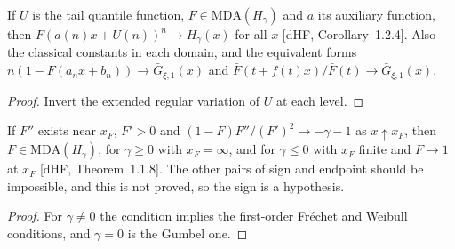 \begin{theorem}
  \label{thm:canonical-norming}
  \leanok
  If $U$ is the tail quantile function, $F \in \mathrm{MDA}(H_\gamma)$ and $a$ its auxiliary function, then
  $F(a(n) x + U(n))^n \to H_\gamma(x)$ for all $x$ [dHF, Corollary~1.2.4]. Also the classical constants in each
  domain, and the equivalent forms $n(1 - F(a_n x + b_n)) \to \bar G_{\xi, 1}(x)$ and
  $\bar F(t + f(t) x)/\bar F(t) \to \bar G_{\xi, 1}(x)$.
\end{theorem}
\begin{proof}
  \leanok
  Invert the extended regular variation of $U$ at each level.
\end{proof}

\begin{theorem}
  \label{thm:von-mises-unified}
  \leanok
  If $F'' $ exists near $x_F$, $F' > 0$ and $(1 - F) F'' / (F')^2 \to -\gamma - 1$ as $x \uparrow x_F$, then
  $F \in \mathrm{MDA}(H_\gamma)$, for $\gamma \ge 0$ with $x_F = \infty$, and for $\gamma \le 0$ with $x_F$
  finite and $F \to 1$ at $x_F$ [dHF, Theorem~1.1.8]. The other pairs of sign and endpoint should be impossible,
  and this is not proved, so the sign is a hypothesis.
\end{theorem}
\begin{proof}
  \leanok
  For $\gamma \ne 0$ the condition implies the first-order Fr\'echet and Weibull conditions, and $\gamma = 0$ is
  the Gumbel one.
\end{proof}
